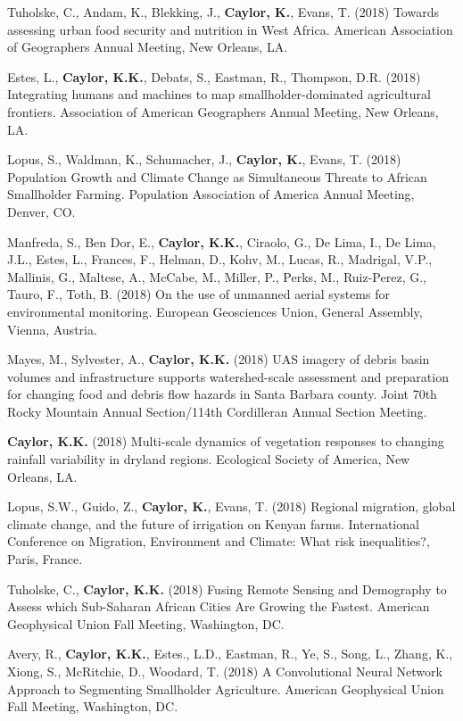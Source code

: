 \begin{etaremune}
\item Tuholske, C., Andam, K., Blekking, J., \textbf{ Caylor, K.}, Evans, T. (2018) Towards assessing urban food security and nutrition in West Africa. American Association of Geographers Annual Meeting, New Orleans, LA.
\item Estes, L., \textbf{ Caylor, K.K.}, Debats, S., Eastman, R., Thompson, D.R. (2018) Integrating humans and machines to map smallholder-dominated agricultural frontiers. Association of American Geographers Annual Meeting, New Orleans, LA.
\item Lopus, S., Waldman, K., Schumacher, J., \textbf{ Caylor, K.}, Evans, T. (2018) Population Growth and Climate Change as Simultaneous Threats to African Smallholder Farming. Population Association of America Annual Meeting, Denver, CO.
\item Manfreda, S., Ben Dor, E., \textbf{ Caylor, K.K.}, Ciraolo, G., De Lima, I., De Lima, J.L., Estes, L., Frances, F., Helman, D., Kohv, M., Lucas, R., Madrigal, V.P., Mallinis, G., Maltese, A., McCabe, M., Miller, P., Perks, M., Ruiz-Perez, G., Tauro, F., Toth, B. (2018) On the use of unmanned aerial systems for environmental monitoring. European Geosciences Union, General Assembly, Vienna, Austria.
\item Mayes, M., Sylvester, A., \textbf{ Caylor, K.K.} (2018) UAS imagery of debris basin volumes and infrastructure supports watershed-scale assessment and preparation for changing food and debris flow hazards in Santa Barbara county. Joint 70th Rocky Mountain Annual Section/114th Cordilleran Annual Section Meeting.
\item \textbf{ Caylor, K.K.} (2018) Multi-scale dynamics of vegetation responses to changing rainfall variability in dryland regions. Ecological Society of America, New Orleans, LA.
\item Lopus, S.W., Guido, Z., \textbf{ Caylor, K.}, Evans, T. (2018) Regional migration, global climate change,
and the future of irrigation on Kenyan farms. International Conference on Migration, Environment and Climate: What risk inequalities?, Paris, France.
\item Tuholske, C., \textbf{ Caylor, K.K.} (2018) Fusing Remote Sensing and Demography to Assess which Sub-Saharan African Cities Are Growing the Fastest. American Geophysical Union Fall Meeting, Washington, DC.
\item Avery, R., \textbf{ Caylor, K.K.}, Estes., L.D., Eastman, R., Ye, S., Song, L., Zhang, K., Xiong, S., McRitchie, D., Woodard, T. (2018) A Convolutional Neural Network Approach to Segmenting Smallholder Agriculture. American Geophysical Union Fall Meeting, Washington, DC.

\end{etaremune}
